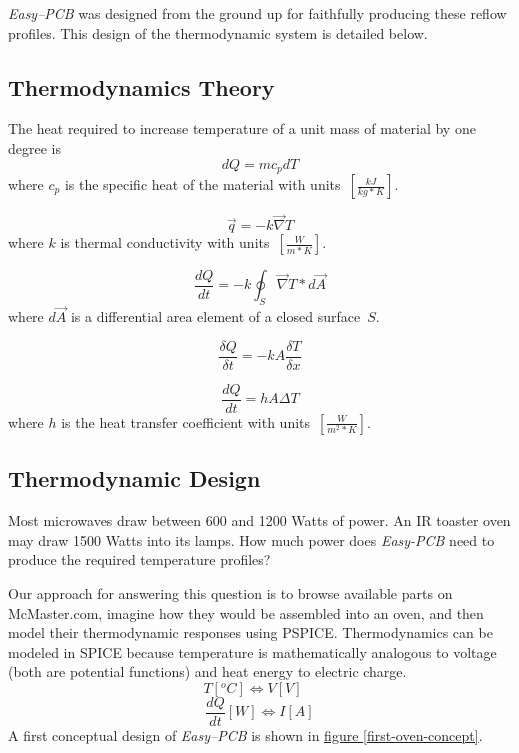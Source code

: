 \documentclass[10pt, twocolumn]{article}
\begin{document}
\emph{Easy--PCB} was designed from the ground up for faithfully producing these
reflow profiles. This design of the thermodynamic system is detailed below.

\subsection{Thermodynamics Theory}

The heat required to increase temperature of a unit mass of material by one degree is
\begin{equation}
dQ=mc_{p}dT
\label{specific-heat-eq}
\end{equation}
where \(c_{p}\) is the specific heat of the material with \mbox{units \(\left[\frac{kJ}{kg*K}\right]\)}.

\begin{equation}
\vec{q}=-k\vec{\nabla}T
\label{fouriers-law-differential-form}
\end{equation}
where \(k\) is thermal conductivity with \mbox{units \(\left[\frac{W}{m*K}\right]\)}.

\begin{equation*}
\frac{dQ}{dt}=-k\oint _{S}\vec{\nabla}T*d\vec{A}
\end{equation*}
where \(d\vec{A}\) is a differential area element of a closed \mbox{surface \(S\)}.

\begin{equation}
\frac{\delta Q}{\delta t}=-kA\frac{\delta T}{\delta x}
\label{fouriers-law-in-1D}
\end{equation}

\begin{equation}
\frac{dQ}{dt}=hA\Delta T
\label{newtons-cooling-law}
\end{equation}
where \(h\) is the heat transfer coefficient with \mbox{units \(\left[\frac{W}{m^{2}*K}\right]\)}.

\subsection{Thermodynamic Design}

Most microwaves draw between 600 and 1200 Watts of power.
An IR toaster oven may draw 1500 Watts into its lamps.
How much power does \emph{Easy-PCB} need to produce the required temperature profiles?

Our approach for answering this question is to browse available parts on McMaster.com,
imagine how they would be assembled into an oven,
and then model their thermodynamic responses using PSPICE.
Thermodynamics can be modeled in SPICE because temperature is
mathematically analogous to voltage (both are potential functions)
and heat energy to electric charge.
\begin{equation*}
T[^{o}C]\Leftrightarrow V[V]\quad
\end{equation*}
\begin{equation*}
\frac{dQ}{dt}[W]\Leftrightarrow I[A]
\end{equation*}
A first conceptual design of \emph{Easy--PCB} is shown in
\hyperref[first-oven-concept]{figure \ref{first-oven-concept}}.
\end{document}
